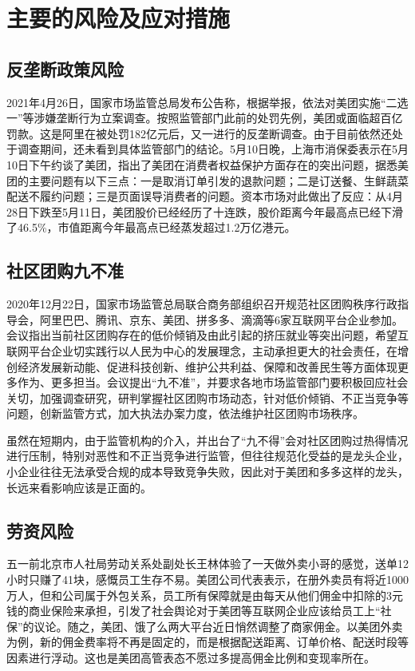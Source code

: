 \documentclass[UTF8,a4paper,12pt,lang=cn,fontset = windows]{elegantpaper} %
\begin{document}
\section{主要的风险及应对措施}
\subsection{反垄断政策风险}
2021年4月26日，国家市场监管总局发布公告称，根据举报，依法对美团实施“二选一”等涉嫌垄断行为立案调查。按照监管部门此前的处罚先例，美团或面临超百亿罚款。这是阿里在被处罚182亿元后，又一进行的反垄断调查。由于目前依然还处于调查期间，还未看到具体监管部门的结论。5月10日晚，上海市消保委表示在5月10日下午约谈了美团，指出了美团在消费者权益保护方面存在的突出问题，据悉美团的主要问题有以下三点：一是取消订单引发的退款问题；二是订送餐、生鲜蔬菜配送不履约问题；三是页面误导消费者的问题。资本市场对此做出了反应：从4月28日下跌至5月11日，美团股价已经经历了十连跌，股价距离今年最高点已经下滑了46.5\%，市值距离今年最高点已经蒸发超过1.2万亿港元。
\subsection{社区团购九不准}
2020年12月22日，国家市场监管总局联合商务部组织召开规范社区团购秩序行政指导会，阿里巴巴、腾讯、京东、美团、拼多多、滴滴等6家互联网平台企业参加。会议指出当前社区团购存在的低价倾销及由此引起的挤压就业等突出问题，希望互联网平台企业切实践行以人民为中心的发展理念，主动承担更大的社会责任，在增创经济发展新动能、促进科技创新、维护公共利益、保障和改善民生等方面体现更多作为、更多担当。会议提出“九不准”，并要求各地市场监管部门要积极回应社会关切，加强调查研究，研判掌握社区团购市场动态，针对低价倾销、不正当竞争等问题，创新监管方式，加大执法办案力度，依法维护社区团购市场秩序。

虽然在短期内，由于监管机构的介入，并出台了“九不得”会对社区团购过热得情况进行压制，特别对恶性和不正当竞争进行监管，但往往规范化受益的是龙头企业，小企业往往无法承受合规的成本导致竞争失败，因此对于美团和多多这样的龙头，长远来看影响应该是正面的。
\subsection{劳资风险}
五一前北京市人社局劳动关系处副处长王林体验了一天做外卖小哥的感觉，送单12小时只赚了41块，感慨员工生存不易。美团公司代表表示，在册外卖员有将近1000万人，但和公司属于外包关系，员工所有保障就是由每天从他们佣金中扣除的3元钱的商业保险来承担，引发了社会舆论对于美团等互联网企业应该给员工上“社保”的议论。随之，美团、饿了么两大平台近日悄然调整了商家佣金。以美团外卖为例，新的佣金费率将不再是固定的，而是根据配送距离、订单价格、配送时段等因素进行浮动。这也是美团高管表态不愿过多提高佣金比例和变现率所在。
\end{document}
